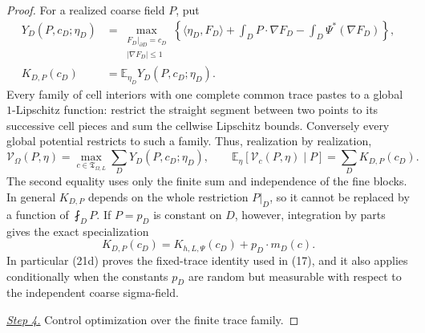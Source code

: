 \documentclass{aomart}
\theoremstyle{definition}
\newcommand{\1}{\mathbf 1}
\begin{document}
\begin{proof}
For a realized coarse field $P$, put
\begin{equation*}
\begin{aligned}
Y_ D(P,c_ D;\eta_ D)&=
\max_ {\substack{F_ D|_ {\partial D}=c_ D\\|\nabla F_ D|\leq1}}
\left\{\langle\eta_ D,F_ D\rangle+
\int_ DP\cdot\nabla F_ D-\int_ D\Psi^*(\nabla F_ D)\right\},\\
K_ {D,P}(c_ D)&=\mathbb E_ {\eta_ D}Y_ D(P,c_ D;\eta_ D).
\end{aligned}
\end{equation*}
Every family of cell interiors with one complete common trace pastes to
a global $1$-Lipschitz function: restrict the straight segment between
two points to its successive cell pieces and sum the cellwise Lipschitz
bounds.  Conversely every global potential restricts to such a family.
Thus, realization by realization,
\begin{equation}
\mathcal V_ \Omega(P,\eta)
=\max_ {c\in\mathfrak T_ {\Omega,L}}\sum_ DY_ D(P,c_ D;\eta_ D),
\qquad
\mathbb E_ \eta[\mathcal V_ c(P,\eta)\mid P]
=\sum_ DK_ {D,P}(c_ D).
\tag{21c}
\end{equation}
The second equality uses only the finite sum and independence of the
fine blocks.  In general $K_ {D,P}$ depends on the whole restriction
$P|_ D$, so it cannot be replaced by a function of $\fint_ DP$.
If $P=p_ D$ is constant on $D$, however, integration by parts gives
the exact specialization
\begin{equation}
K_ {D,P}(c_ D)=K_ {h,L,\Psi}(c_ D)+p_ D\cdot m_ D(c).
\tag{21d}
\end{equation}
In particular (21d) proves the fixed-trace identity used in (17), and
it also applies conditionally when the constants $p_ D$ are random but
measurable with respect to the independent coarse sigma-field.

\smallskip\noindent
\underline{\textit{Step 4.}} Control optimization over the finite trace family.


\end{proof}
\end{document}
